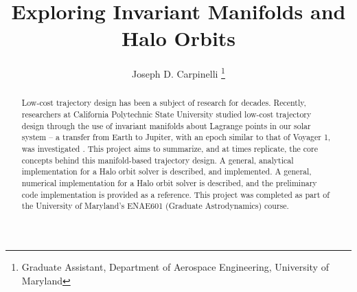 \documentclass[conf]{new-aiaa}
\title{Exploring Invariant Manifolds and Halo Orbits}
\author{Joseph D. Carpinelli
    \footnote{
        Graduate Assistant, 
        Department of Aerospace Engineering, 
        University of Maryland}}
\affil{University of Maryland, College Park, Maryland, 20740}
\begin{document}
\maketitle
\nocite{*}

\begin{abstract}
Low-cost trajectory design has been a subject of research for decades.
Recently, researchers at California Polytechnic State University
studied low-cost trajectory design through the use of invariant
manifolds about Lagrange points in our solar system -- a 
transfer from Earth to Jupiter, with an epoch similar to 
that of Voyager 1, was investigated 
\cite{rund2018interplanetary}. 
This project aims to summarize,
and at times replicate, the core concepts behind this manifold-based 
trajectory design.
A general, analytical 
implementation for a Halo orbit solver is described, and implemented.
A general, numerical implementation for a Halo orbit solver is 
described, and the preliminary code implementation is provided
as a reference. 
This project was completed as part of the University of 
Maryland's ENAE601 (Graduate Astrodynamics) course.
\end{abstract}
\end{document}
